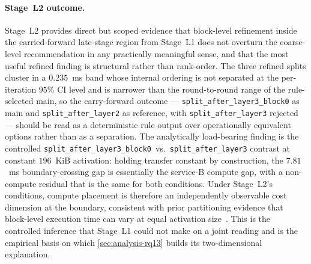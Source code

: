 \paragraph{Stage~L2 outcome.}
Stage~L2 provides direct but scoped evidence that block-level refinement
inside the carried-forward late-stage region from Stage~L1 does not overturn
the coarse-level recommendation in any practically meaningful sense, and
that the most useful refined finding is structural rather than rank-order.
The three refined splits cluster in a \(0.235\)~ms band whose internal
ordering is not separated at the per-iteration \(95\%\) CI level and is
narrower than the round-to-round range of the rule-selected main, so the
carry-forward outcome --- \texttt{split\_after\_layer3\_block0} as main and
\texttt{split\_after\_layer2} as reference, with \texttt{split\_after\_layer3}
rejected --- should be read as a deterministic rule output over
operationally equivalent options rather than as a separation. The
analytically load-bearing finding is the controlled
\texttt{split\_after\_layer3\_block0}~vs.~\texttt{split\_after\_layer3}
contrast at constant \(196\)~KiB activation: holding transfer constant by
construction, the \(7.81\)~ms boundary-crossing gap is essentially the
service-B compute gap, with a non-compute residual that is the same for
both conditions. Under Stage~L2's conditions, compute placement is therefore
an independently observable cost dimension at the boundary, consistent with
prior partitioning evidence that block-level execution time can vary at
equal activation size~\cite{pareto_split}. This is the controlled inference
that Stage~L1 could not make on a joint reading and is the empirical basis on
which \cref{sec:analysis-rq13} builds its two-dimensional explanation.
